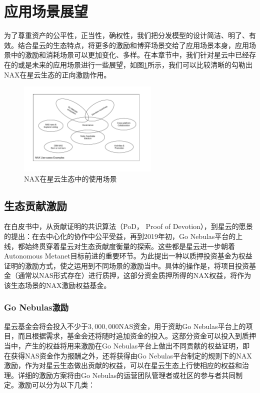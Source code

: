 \section{应用场景展望}
为了尊重资产的公平性，正当性，确权性，我们把分发模型的设计简洁、明了、有效。结合星云的生态特点，将更多的激励和博弈场景交给了应用场景本身，应用场景中的激励和消耗场景可以更加变化、多样。在本章节中，我们针对星云中已经存在的或是未来的应用场景进行一些展望，如图\ref{fig:nax_ecosys}所示，我们可以比较清晰的勾勒出NAX在星云生态的正向激励作用。

\begin{figure}[h]
  \centering
  \includegraphics[width=0.6\textwidth]{../common/usecases.pdf}
  \caption{NAX在星云生态中的使用场景 \label{fig:nax_ecosys}}
\end{figure}

\subsection{生态贡献激励}
在白皮书中，从贡献证明的共识算法（PoD， Proof of Devotion），到星云的愿景的提出：在去中心化的协作中公平受益，再到2019年初，Go Nebulas平台的上线，都始终贯穿着星云对生态贡献度衡量的探索。这些都是星云进一步朝着Autonomous Metanet目标前进的重要环节。为此提出一种以质押投资基金为权益证明的激励方式，使之运用到不同场景的激励当中。具体的操作是，将项目投资基金（通常以NAS形式存在）进行质押，这部分资金质押所得的NAX权益，将作为该生态场景的NAX激励权益基金。

\subsubsection{Go Nebulas激励}
星云基金会将会投入不少于$3,000,000$NAS资金，用于资助Go Nebulas平台上的项目，而且根据需求，基金会还将随时追加资金的投入。这部分资金可以投入到质押当中，产生的权益将用来激励在Go Nebulas平台上做出不同贡献的权益证明，即在获得NAS资金作为报酬之外，还将获得由Go Nebulas平台制定的规则下的NAX激励，作为对星云生态做出贡献的权益，可以在星云生态上行使相应的权益和治理。详细的激励方案将由Go Nebulas的运营团队管理者或社区的参与者共同制定。激励可以分为以下几类：

